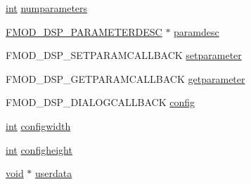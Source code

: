 \begin{DoxyCompactItemize}
\item 
\hyperlink{wglew_8h_a500a82aecba06f4550f6849b8099ca21}{int} \hyperlink{struct_f_m_o_d___d_s_p___d_e_s_c_r_i_p_t_i_o_n_a6258ca66c8ed1583159b0a6d3bf05d68}{numparameters}
\item 
\hyperlink{struct_f_m_o_d___d_s_p___p_a_r_a_m_e_t_e_r_d_e_s_c}{F\-M\-O\-D\-\_\-\-D\-S\-P\-\_\-\-P\-A\-R\-A\-M\-E\-T\-E\-R\-D\-E\-S\-C} $\ast$ \hyperlink{struct_f_m_o_d___d_s_p___d_e_s_c_r_i_p_t_i_o_n_a06e200c4e4316a4fd05649a4d14db422}{paramdesc}
\item 
F\-M\-O\-D\-\_\-\-D\-S\-P\-\_\-\-S\-E\-T\-P\-A\-R\-A\-M\-C\-A\-L\-L\-B\-A\-C\-K \hyperlink{struct_f_m_o_d___d_s_p___d_e_s_c_r_i_p_t_i_o_n_af8f88dcd36c8bedd7e675c99e43824a7}{setparameter}
\item 
F\-M\-O\-D\-\_\-\-D\-S\-P\-\_\-\-G\-E\-T\-P\-A\-R\-A\-M\-C\-A\-L\-L\-B\-A\-C\-K \hyperlink{struct_f_m_o_d___d_s_p___d_e_s_c_r_i_p_t_i_o_n_a1cc169e951257f2d5fe5f7f31dd92011}{getparameter}
\item 
F\-M\-O\-D\-\_\-\-D\-S\-P\-\_\-\-D\-I\-A\-L\-O\-G\-C\-A\-L\-L\-B\-A\-C\-K \hyperlink{struct_f_m_o_d___d_s_p___d_e_s_c_r_i_p_t_i_o_n_a9264d74f606ed0cf5f23a4633c30b3b6}{config}
\item 
\hyperlink{wglew_8h_a500a82aecba06f4550f6849b8099ca21}{int} \hyperlink{struct_f_m_o_d___d_s_p___d_e_s_c_r_i_p_t_i_o_n_a245ac31fdb312449734f15ff8c03c0f0}{configwidth}
\item 
\hyperlink{wglew_8h_a500a82aecba06f4550f6849b8099ca21}{int} \hyperlink{struct_f_m_o_d___d_s_p___d_e_s_c_r_i_p_t_i_o_n_a896589017397442724a4e26a6aa2d921}{configheight}
\item 
\hyperlink{wglew_8h_aeea6e3dfae3acf232096f57d2d57f084}{void} $\ast$ \hyperlink{struct_f_m_o_d___d_s_p___d_e_s_c_r_i_p_t_i_o_n_a1610f0c65c07582271120060e36e9d87}{userdata}
\end{DoxyCompactItemize}


